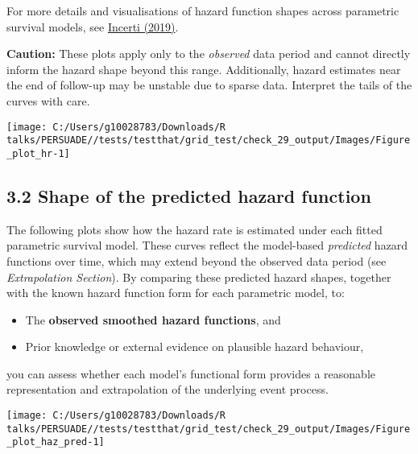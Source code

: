 \documentclass[
]{article}
\providecommand{\tightlist}{%
  \setlength{\itemsep}{0pt}\setlength{\parskip}{0pt}}
\begin{document}
For more details and visualisations of hazard function shapes across
parametric survival models, see
\href{https://devinincerti.com/2019/06/18/parametric_survival.html}{Incerti
(2019)}.

\textbf{Caution:} These plots apply only to the \emph{observed} data
period and cannot directly inform the hazard shape beyond this range.
Additionally, hazard estimates near the end of follow-up may be unstable
due to sparse data. Interpret the tails of the curves with care.

\clearpage

\begin{flushleft}\texttt{[image: C:/Users/g10028783/Downloads/R talks/PERSUADE//tests/testthat/grid\_test/check\_29\_output/Images/Figure\_plot\_hr-1]} \end{flushleft}

\clearpage

\subsection{3.2 Shape of the predicted hazard
function}\label{shape-of-the-predicted-hazard-function}

The following plots show how the hazard rate is estimated under each
fitted parametric survival model. These curves reflect the model-based
\emph{predicted} hazard functions over time, which may extend beyond the
observed data period (see \emph{Extrapolation Section}). By comparing
these predicted hazard shapes, together with the known hazard function
form for each parametric model, to:

\begin{itemize}
\tightlist
\item
  The \textbf{observed smoothed hazard functions}, and\\
\item
  Prior knowledge or external evidence on plausible hazard behaviour,
\end{itemize}

you can assess whether each model's functional form provides a
reasonable representation and extrapolation of the underlying event
process.

\clearpage

\begin{flushleft}\texttt{[image: C:/Users/g10028783/Downloads/R talks/PERSUADE//tests/testthat/grid\_test/check\_29\_output/Images/Figure\_plot\_haz\_pred-1]} \end{flushleft}
\end{document}
